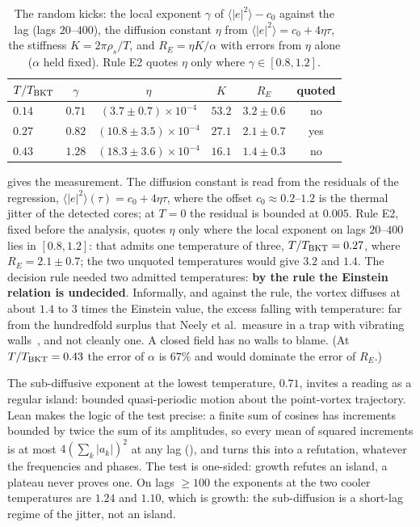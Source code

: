 \begin{table}[!tb]\centering\small
\begin{tabular}{lccccc}
\toprule
$T/T_{\rm BKT}$ & $\gamma$ & $\eta$ & $K$ & $R_E$ & quoted\\
\midrule
$0.14$ & $0.71$ & $(3.7\pm0.7)\times10^{-4}$ & $53.2$ & $3.2\pm0.6$ & no \\
$0.27$ & $0.82$ & $(10.8\pm3.5)\times10^{-4}$ & $27.1$ & $2.1\pm0.7$ & yes \\
$0.43$ & $1.28$ & $(18.3\pm3.6)\times10^{-4}$ & $16.1$ & $1.4\pm0.3$ & no \\
\bottomrule
\end{tabular}
\caption{The random kicks: the local exponent $\gamma$ of $\langle|e|^2\rangle-c_0$ against the lag (lags $20$--$400$), the diffusion constant $\eta$ from $\langle|e|^2\rangle=c_0+4\eta\tau$, the stiffness $K=2\pi\rho_s/T$, and $R_E=\eta K/\alpha$ with errors from $\eta$ alone ($\alpha$ held fixed). Rule E2 quotes $\eta$ only where $\gamma\in[0.8,1.2]$.}
\label{ch07:tab-kicks}
\end{table}

 gives the measurement. The diffusion constant is read from the residuals of the regression, $\langle|e|^2\rangle(\tau)=c_0+4\eta\tau$, where the offset $c_0\approx0.2$--$1.2$ is the thermal jitter of the detected cores; at $T=0$ the residual is bounded at $0.005$. Rule E2, fixed before the analysis, quotes $\eta$ only where the local exponent on lags $20$--$400$ lies in $[0.8,1.2]$: that
admits one temperature of three, $T/T_{\rm BKT}=0.27$, where $R_E=2.1\pm0.7$; the two unquoted temperatures would give $3.2$ and $1.4$. The decision rule needed two admitted temperatures: \textbf{by the rule the Einstein relation is undecided}. Informally, and against the rule, the vortex diffuses at about $1.4$ to $3$ times the Einstein value, the excess falling with temperature: far from
the hundredfold surplus that Neely et al.\ measure in a trap with vibrating walls~\cite{Neely2024}, and not cleanly one. A closed field has no walls to blame. (At $T/T_{\rm BKT}=0.43$ the error of $\alpha$ is $67\%$ and would dominate the error of $R_E$.)

The sub-diffusive exponent at the lowest temperature, $0.71$, invites a reading as a regular island: bounded quasi-periodic motion about the point-vortex trajectory. Lean makes the logic of the test precise: a finite sum of cosines has increments bounded by twice the sum of its amplitudes, so every mean of squared increments is at most $4(\sum_k|a_k|)^2$ at any lag
(), and  turns this into a refutation, whatever the frequencies and phases. The test is one-sided: growth refutes an island, a plateau never proves one. On lags $\ge100$ the exponents at the two cooler temperatures are $1.24$ and $1.10$, which is growth: the sub-diffusion is a short-lag regime of the jitter, not an island.

